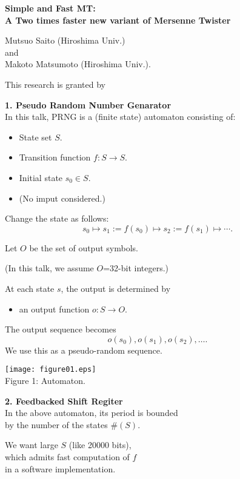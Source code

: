 \documentclass[a4j,12pt,landscape]{jarticle}
\title{}
\author{}
\date{\today}
\begin{document}
\Huge

\vspace*{2cm}
\begin{center}
{\bf Simple and Fast MT:\\
  A Two times faster new variant of Mersenne Twister}
\vspace{1cm}

Mutsuo Saito (Hiroshima Univ.) \\
and \\
Makoto Matsumoto (Hiroshima Univ.).
\end{center}
\vspace{\fill}
This research is granted by 
\newpage

\newpage
\noindent
{\bf 1. Pseudo Random Number Genarator}\\

In this talk, PRNG is a (finite state) automaton consisting of:
\begin{itemize}
\item State set $S$. 
\item Transition function $f:S \to S$.
\item Initial state $s_0 \in S$.
\item (No imput considered.)
\end{itemize}
Change the state as follows:
$$
s_0 \mapsto s_1:= f(s_0) \mapsto s_2:=f(s_1) \mapsto \cdots.
$$

\newpage
Let $O$ be the set of output symbols.

(In this talk, we assume $O$=32-bit integers.)

\vskip 1cm
At each state $s$, 
the output is determined by 
\begin{itemize}
\item an output function $o:S \to O$.
\end{itemize}
The output sequence becomes
$$
o(s_0),o(s_1),o(s_2),\ldots.
$$
We use this as a pseudo-random sequence.
\newpage
\begin{center}
\texttt{[image: figure01.eps]}
\\
Figure 1: Automaton.
\end{center}

 
\newpage
\noindent
{\bf 2. Feedbacked Shift Regiter}\\
In the above automaton, 
its period is bounded  \\
by the number of the states $\#(S)$.

\vskip 5mm
We want large $S$ (like 20000 bits), \\
which admits fast computation of $f$ \\
in a software implementation.
\end{document}
